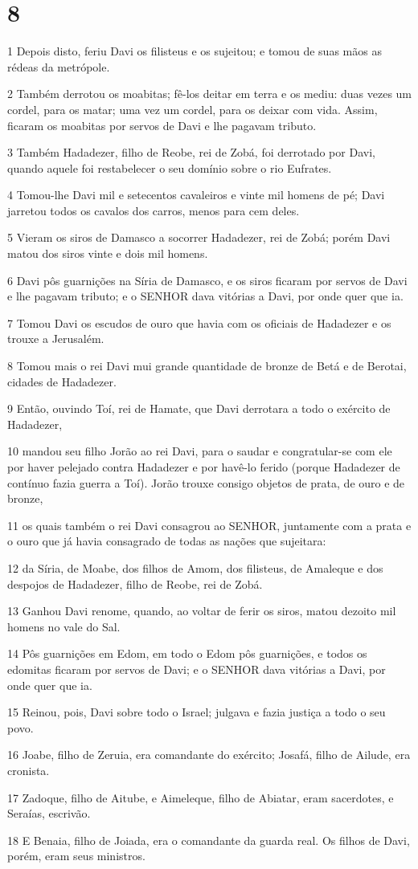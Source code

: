 \chapter{8}

\par 1 Depois disto, feriu Davi os filisteus e os sujeitou; e tomou de suas mãos as rédeas da metrópole.
\par 2 Também derrotou os moabitas; fê-los deitar em terra e os mediu: duas vezes um cordel, para os matar; uma vez um cordel, para os deixar com vida. Assim, ficaram os moabitas por servos de Davi e lhe pagavam tributo.
\par 3 Também Hadadezer, filho de Reobe, rei de Zobá, foi derrotado por Davi, quando aquele foi restabelecer o seu domínio sobre o rio Eufrates.
\par 4 Tomou-lhe Davi mil e setecentos cavaleiros e vinte mil homens de pé; Davi jarretou todos os cavalos dos carros, menos para cem deles.
\par 5 Vieram os siros de Damasco a socorrer Hadadezer, rei de Zobá; porém Davi matou dos siros vinte e dois mil homens.
\par 6 Davi pôs guarnições na Síria de Damasco, e os siros ficaram por servos de Davi e lhe pagavam tributo; e o SENHOR dava vitórias a Davi, por onde quer que ia.
\par 7 Tomou Davi os escudos de ouro que havia com os oficiais de Hadadezer e os trouxe a Jerusalém.
\par 8 Tomou mais o rei Davi mui grande quantidade de bronze de Betá e de Berotai, cidades de Hadadezer.
\par 9 Então, ouvindo Toí, rei de Hamate, que Davi derrotara a todo o exército de Hadadezer,
\par 10 mandou seu filho Jorão ao rei Davi, para o saudar e congratular-se com ele por haver pelejado contra Hadadezer e por havê-lo ferido (porque Hadadezer de contínuo fazia guerra a Toí). Jorão trouxe consigo objetos de prata, de ouro e de bronze,
\par 11 os quais também o rei Davi consagrou ao SENHOR, juntamente com a prata e o ouro que já havia consagrado de todas as nações que sujeitara:
\par 12 da Síria, de Moabe, dos filhos de Amom, dos filisteus, de Amaleque e dos despojos de Hadadezer, filho de Reobe, rei de Zobá.
\par 13 Ganhou Davi renome, quando, ao voltar de ferir os siros, matou dezoito mil homens no vale do Sal.
\par 14 Pôs guarnições em Edom, em todo o Edom pôs guarnições, e todos os edomitas ficaram por servos de Davi; e o SENHOR dava vitórias a Davi, por onde quer que ia.
\par 15 Reinou, pois, Davi sobre todo o Israel; julgava e fazia justiça a todo o seu povo.
\par 16 Joabe, filho de Zeruia, era comandante do exército; Josafá, filho de Ailude, era cronista.
\par 17 Zadoque, filho de Aitube, e Aimeleque, filho de Abiatar, eram sacerdotes, e Seraías, escrivão.
\par 18 E Benaia, filho de Joiada, era o comandante da guarda real. Os filhos de Davi, porém, eram seus ministros.

